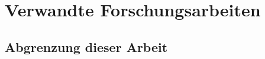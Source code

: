 \chapter{Verwandte Forschungsarbeiten}
\label{ch:relatedwork}
\lipsum[1-2]

%
%
\section{Abgrenzung dieser Arbeit}
\label{sec:relatedwork:differentiation}
